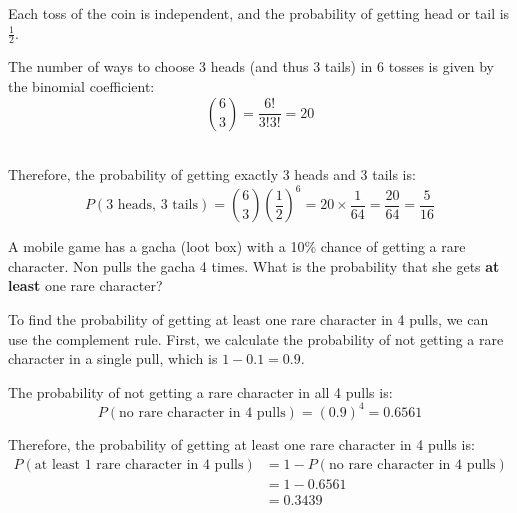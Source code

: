 \documentclass[a4paper, 10pt]{article}
\begin{document}
\begin{solution}
Each toss of the coin is independent, and the probability of getting head or tail is \( \frac{1}{2} \).
\\
\par The number of ways to choose 3 heads (and thus 3 tails) in 6 tosses is given by the binomial coefficient:
\[
\binom{6}{3} = \frac{6!}{3!3!} = 20
\]
\\
\par Therefore, the probability of getting exactly 3 heads and 3 tails is:
\[
P(\text{3 heads, 3 tails}) = \binom{6}{3} \left( \frac{1}{2} \right)^6 = 20 \times \frac{1}{64} = \frac{20}{64} = \boxed{\frac{5}{16}}
\]
\end{solution}


\pagebreak


\begin{problem}
A mobile game has a gacha (loot box) with a 10\% chance of getting a rare character.
Non pulls the gacha 4 times. What is the probability that she gets \textbf{at least} one rare character?
\end{problem}

\begin{solution}
To find the probability of getting at least one rare character in 4 pulls, we can use the complement rule.
First, we calculate the probability of not getting a rare character in a single pull, which is \(1 - 0.1 = 0.9\).

The probability of not getting a rare character in all 4 pulls is:
\[
P(\text{no rare character in 4 pulls}) = (0.9)^4 = 0.6561
\]

Therefore, the probability of getting at least one rare character in 4 pulls is:
\begin{align*}
    P(\text{at least 1 rare character in 4 pulls}) &= 1 - P(\text{no rare character in 4 pulls}) \\
    &= 1 - 0.6561 \\
    &= \boxed{0.3439}
\end{align*}
\end{solution}
\end{document}

